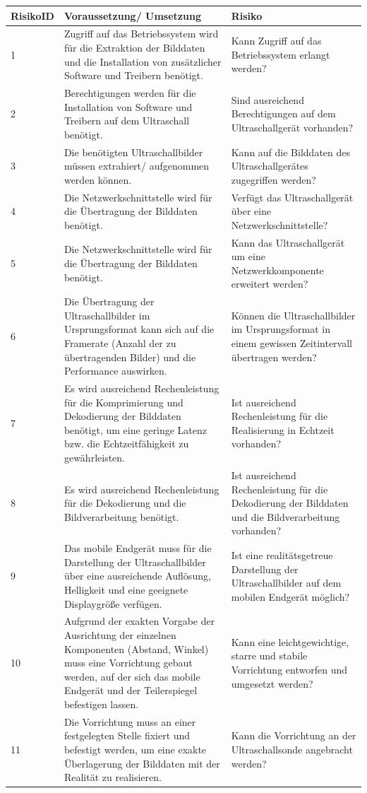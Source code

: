 \begin{center}
\begin{table} [H]
\small
    \begin{tabular}{ | p{} | p{} | p{} |}
    \hline
   \textbf{RisikoID} &  \textbf{Voraussetzung/ Umsetzung} & \textbf{Risiko}\\
      \hline
      	1	
      & Zugriff auf das Betriebssystem wird für die Extraktion der Bilddaten und die Installation von zusätzlicher Software und Treibern benötigt. 	
      & Kann Zugriff auf das Betriebssystem erlangt werden? \\
      \hline
	  2	
	& Berechtigungen werden für die Installation von Software und Treibern auf dem Ultraschall benötigt.	
	& Sind ausreichend Berechtigungen auf dem Ultraschallgerät vorhanden? \\
	\hline
	3
	& Die benötigten Ultraschallbilder müssen extrahiert/ aufgenommen werden können.	
	& Kann auf die Bilddaten des Ultraschallgerätes zugegriffen werden? \\
	\hline
	4	
	& Die Netzwerkschnittstelle wird für die Übertragung der Bilddaten benötigt.	
	& Verfügt das Ultraschallgerät über eine Netzwerkschnittstelle? \\
	\hline
	5	
	& Die Netzwerkschnittstelle wird für die Übertragung der Bilddaten benötigt.	
	& Kann das Ultraschallgerät um eine Netzwerkkomponente erweitert werden? \\
	\hline
	6	
	& Die Übertragung der Ultraschallbilder im Ursprungsformat kann sich auf die Framerate (Anzahl der zu übertragenden Bilder) und die Performance auswirken.	
	& Können die Ultraschallbilder im Ursprungsformat in einem gewissen Zeitintervall übertragen werden? \\
	\hline
	7	
	& Es wird ausreichend Rechenleistung für die Komprimierung und Dekodierung der Bilddaten benötigt, um eine geringe Latenz bzw. die Echtzeitfähigkeit zu gewährleisten.	
	& Ist ausreichend Rechenleistung für die Realisierung in Echtzeit vorhanden? \\
	\hline
	8	
	& Es wird ausreichend Rechenleistung für die Dekodierung und die Bildverarbeitung benötigt.	
	& Ist ausreichend Rechenleistung für die Dekodierung der Bilddaten und die Bildverarbeitung vorhanden?\\
	\hline
	9	
	& Das mobile Endgerät muss für die Darstellung der Ultraschallbilder über eine ausreichende Auflösung, Helligkeit und eine geeignete Displaygröße verfügen.	
	& Ist eine realitätsgetreue Darstellung der Ultraschallbilder auf dem mobilen Endgerät möglich? \\
	\hline
	10	
	& Aufgrund der exakten Vorgabe der Ausrichtung der einzelnen Komponenten (Abstand, Winkel) muss eine Vorrichtung gebaut werden, auf der sich das mobile Endgerät und der Teilerspiegel befestigen lassen.	
	& Kann eine leichtgewichtige, starre und stabile Vorrichtung entworfen und umgesetzt werden? \\
	\hline
	11	
	& Die Vorrichtung muss  an einer festgelegten Stelle fixiert und befestigt werden, um eine exakte Überlagerung der Bilddaten mit der Realität zu realisieren.	
	& Kann die Vorrichtung an der Ultraschallsonde angebracht werden? \\
\hline
  

\end{tabular}
\end{table}
\end{center}
